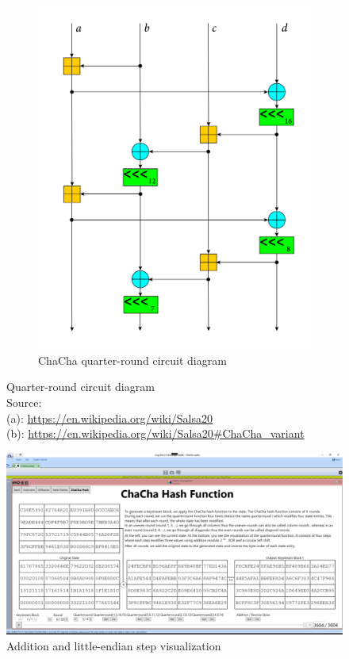 \begin{figure}
\begin{subfigure}[t]{0.5\textwidth}
  \centering
  \includegraphics[width=\textwidth]{figures/wiki-qr-circuit/chacha-wiki-qr-circuit.png}
  \caption[ChaCha quarter-round circuit diagram]{ChaCha quarter-round circuit diagram}
  \label{fig:wiki.qr.circuit.chacha}
\end{subfigure}
\caption[Quarter-round circuit diagram]{Quarter-round circuit diagram\\
Source:\\
(a): \url{https://en.wikipedia.org/wiki/Salsa20}\\
(b): \url{https://en.wikipedia.org/wiki/Salsa20\#ChaCha_variant}}
\label{fig:wiki.qr.circuit}
\centering
\includegraphics[width=\textwidth]{figures/ct2/chachahash/chachahash-end.png}
\caption{Addition and little-endian step visualization}
\label{fig:chachahash.end}
\end{figure}

